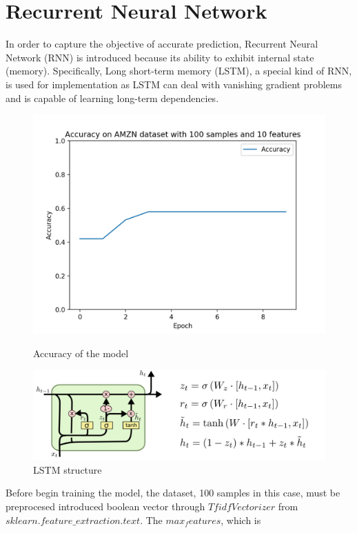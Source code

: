 \documentclass{article}
\begin{document}
\section{Recurrent Neural Network}
\indent In order to capture the objective of accurate prediction, Recurrent Neural Network (RNN) is introduced
 because its ability to exhibit internal state (memory). Specifically, Long short-term memory (LSTM),
 a special kind of RNN, is used for implementation as LSTM can deal with vanishing gradient problems
 and is capable of learning long-term dependencies.
\\
\begin{figure}
    \centering
    \includegraphics[scale=0.5]{assets/Accuracy.png}\\
    \caption{Accuracy of the model}
\end{figure}
\begin{figure}
    \centering
    \includegraphics[scale=0.4]{assets/LSTM.png}
    \caption{LSTM structure}
\end{figure}
Before begin training the model, the dataset, 100 samples in this case, must be preprocesed introduced
 boolean vector through $TfidfVectorizer$ from $sklearn.feature\_extraction.text$. The $max_features$, which is
\end{document}

